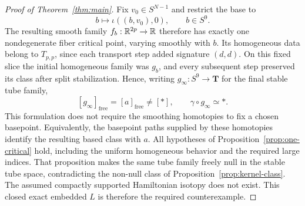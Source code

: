 \begin{proof}[Proof of Theorem~\ref{thm:main}]
Fix $v_0\in S^{N-1}$ and restrict the base to
\[
 b\longmapsto\iota((b,v_0),0),\qquad b\in S^9.
\]
The resulting smooth family $f_b:\mathbb R^{2p}\to\mathbb R$ therefore has
exactly one nondegenerate fiber critical point, varying smoothly
with $b$.  Its homogeneous data belong to $T_{p,p}$, since each
transport step added signature $(d,d)$.  On this fixed slice the
initial homogeneous family was $g_b$, and every subsequent step
preserved its class after split stabilization.  Hence, writing
$g_\infty:S^9\to\mathbf T$ for the final stable tube family,
\[
 [g_\infty]_{\mathrm{free}}=[a]_{\mathrm{free}}\ne[*],
 \qquad \gamma\circ g_\infty\simeq *.
\]
This formulation does not require the smoothing homotopies to fix a
chosen basepoint.  Equivalently, the basepoint paths supplied by
these homotopies identify the resulting based class with $a$.
All hypotheses of Proposition~\ref{prop:one-critical} hold, including
the uniform homogeneous behavior and the required large indices.
That proposition makes the same tube family freely null in the
stable tube space, contradicting the non-null class of
Proposition~\ref{prop:kernel-class}.  The assumed compactly supported
Hamiltonian isotopy does not exist.  This closed exact embedded $L$
is therefore the required counterexample.
\end{proof}
